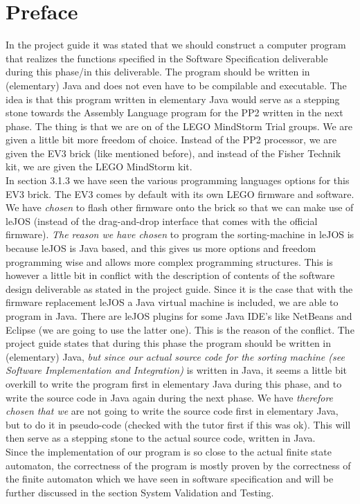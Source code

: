 \section{Preface}
In the project guide it was stated that we should construct a computer program that realizes the functions specified in the Software Specification deliverable during this phase/in this deliverable. The program should be written in (elementary) Java and does not even have to be compilable and executable. The idea is that this program written in elementary Java would serve as a stepping stone towards the Assembly Language program for the PP2 written in the next phase. The thing is that we are on of the LEGO MindStorm Trial groups. We are given a little bit more freedom of choice. Instead of the PP2 processor, we are given the EV3 brick (like mentioned before), and instead of the Fisher Technik kit, we are given the LEGO MindStorm kit. \\

In section 3.1.3 we have seen the various programming languages options for this EV3 brick. The EV3 comes by default with its own LEGO firmware and software. We have \emph{chosen} to flash other firmware onto the brick so that we can make use of leJOS (instead of the drag-and-drop interface that comes with the official firmware). \emph{The reason we have chosen} to program the sorting-machine in leJOS is because leJOS is Java based, and this gives us more options and freedom programming wise and allows more complex programming structures. This is however a little bit in conflict with the  description of contents of the software design deliverable as stated in the project guide. Since it is the case that with the firmware replacement leJOS a Java virtual machine is included, we are able to program in Java. There are leJOS plugins for some Java IDE's like NetBeans and Eclipse (we are going to use the latter one). This is the reason of the conflict. The project guide states that during this phase the program should be written in (elementary) Java, \emph{but since our actual source code for the sorting machine (see Software Implementation and Integration)} is written in Java, it seems a little bit overkill to write the program first in elementary Java during this phase, and to write the source code in Java again during the next phase. We have \emph{therefore chosen that we} are not going to write the source code first in elementary Java, but to do it in pseudo-code (checked with the tutor first if this was ok). This will then serve as a stepping stone to the actual source code, written in Java.\\

Since the implementation of our program is so close to the actual finite state automaton, the correctness of the program is mostly proven  by the correctness of the finite automaton which we have seen in software specification and will be further discussed in the section System Validation and Testing.